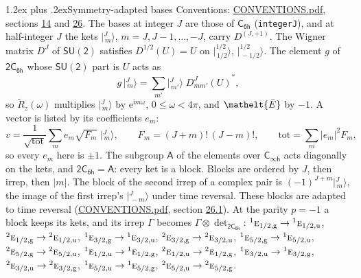\documentclass[10pt,a4paper]{article}
\makeatletter
\renewcommand\section{\@startsection{section}{1}{\z@}{-3ex plus -1ex minus -.2ex}%
  {1.2ex plus .2ex}{\normalfont\large\sffamily\bfseries\color{parttitle}}}
\numberwithin{equation}{section}
\newcommand{\eltfont}[1]{{\let\sigma\eltsigma\mathelt{#1}}}
\newcommand{\grp}[1]{\mathsf{#1}}
\newcommand{\irr}[1]{\text{\normalfont\scshape #1}}
\newcommand{\conjpair}[1]{{}^{#1}}
\newcommand{\elt}[1]{\eltfont{#1}}
\newcommand{\ptag}[1]{\mathrm{#1}}
\newcommand{\iunit}{\mathrm{i}}
\newcommand{\expe}{\mathrm{e}}
\newcommand{\irrJp}[2]{D^{(#1,#2)}}
\newcommand{\wignerD}[1]{D^{#1}}
\newcommand{\conj}[1]{{#1}^{*}}
\newcommand{\irrprod}{\otimes}
\newcommand{\jm}[2]{\bigl\lvert{}^{#1}_{\,#2}\bigr\rangle}
\newcommand{\barred}[1]{\bar{#1}}
\newcommand{\lift}[1]{\tilde{#1}}
\makeatother
\begin{document}
\section{Symmetry-adapted bases}\label{s:bases}
Conventions: \href{../../CONVENTIONS.pdf}{CONVENTIONS.pdf}, sections \href{../../../rotation/CONVENTIONS.pdf\#conv.14}{14} and \href{../../CONVENTIONS.pdf\#conv.26}{26}.
\leavevmode\label{n:index.m}\label{n:vector.ket}The bases at integer $J$ are those of \href{../../../rotation/data/pdf/C6h.pdf}{$\grp{C_{6h}}$} (\texttt{integerJ}), and at half-integer $J$ the kets $\jm{J}{m}$, $m = J, J-1, \dots, -J$, carry $\irrJp{J}{+1}$. \label{n:matrix.wigner}The Wigner matrix $\wignerD{J}$ of $\grp{SU(2)}$ satisfies $\wignerD{1/2}(U) = U$ on $\jm{1/2}{1/2}$, $\jm{1/2}{-1/2}$. The element $g$ of $\grp{2C_{6h}}$ whose $\grp{SU(2)}$ part is $U$ acts as
\begin{equation}\label{e:action}g\,\jm{J}{m} = \sum_{m'} \jm{J}{m'}\; \conj{\wignerD{J}_{m m'}(U)},\end{equation}
so $\lift{R}_{z}(\omega)$ multiplies $\jm{J}{m}$ by $\expe^{\iunit m\omega}$, $0 \le \omega < 4\pi$, and $\elt{\barred{E}}$ by $-1$. \label{n:index.ketcoefficient}\label{n:vector.basis.symmetry}\label{n:index.ketweight}\label{n:index.total}A vector is listed by its coefficients $e_m$:
\begin{equation}\label{e:ket}v = \frac{1}{\sqrt{\mathrm{tot}}}\sum_m e_m\sqrt{F_m}\;\jm{J}{m},\qquad F_m = (J+m)!\,(J-m)!,\qquad \mathrm{tot} = \sum_m |e_m|^2F_m,\end{equation}
so every $e_m$ here is $\pm 1$.
\leavevmode\label{n:group.A}The subgroup $\grp{A}$ of the elements over $\grp{C_{\infty h}}$ acts diagonally on the kets, and $\grp{2C_{6h}} = \grp{A}$: every ket is a block. Blocks are ordered by $J$, then irrep, then $|m|$. The block of the second irrep of a complex pair is $(-1)^{J+m}\jm{J}{m}$, the image of the first irrep's $\jm{J}{-m}$ under time reversal. These blocks are adapted to time reversal (\href{../../CONVENTIONS.pdf}{CONVENTIONS.pdf}, section \href{../../CONVENTIONS.pdf\#conv.26.1}{26.1}).
At the parity $p = -1$ a block keeps its kets, and its irrep $\Gamma$ becomes $\Gamma \irrprod \det_{\grp{2C_{6h}}}$: $\conjpair{1}\irr{e}_{1/2,\ptag{g}} \to \conjpair{1}\irr{e}_{1/2,\ptag{u}}$, $\conjpair{2}\irr{e}_{1/2,\ptag{g}} \to \conjpair{2}\irr{e}_{1/2,\ptag{u}}$, $\conjpair{1}\irr{e}_{3/2,\ptag{g}} \to \conjpair{1}\irr{e}_{3/2,\ptag{u}}$, $\conjpair{2}\irr{e}_{3/2,\ptag{g}} \to \conjpair{2}\irr{e}_{3/2,\ptag{u}}$, $\conjpair{1}\irr{e}_{5/2,\ptag{g}} \to \conjpair{1}\irr{e}_{5/2,\ptag{u}}$, $\conjpair{2}\irr{e}_{5/2,\ptag{g}} \to \conjpair{2}\irr{e}_{5/2,\ptag{u}}$, $\conjpair{1}\irr{e}_{1/2,\ptag{u}} \to \conjpair{1}\irr{e}_{1/2,\ptag{g}}$, $\conjpair{2}\irr{e}_{1/2,\ptag{u}} \to \conjpair{2}\irr{e}_{1/2,\ptag{g}}$, $\conjpair{1}\irr{e}_{3/2,\ptag{u}} \to \conjpair{1}\irr{e}_{3/2,\ptag{g}}$, $\conjpair{2}\irr{e}_{3/2,\ptag{u}} \to \conjpair{2}\irr{e}_{3/2,\ptag{g}}$, $\conjpair{1}\irr{e}_{5/2,\ptag{u}} \to \conjpair{1}\irr{e}_{5/2,\ptag{g}}$, $\conjpair{2}\irr{e}_{5/2,\ptag{u}} \to \conjpair{2}\irr{e}_{5/2,\ptag{g}}$.
\end{document}
